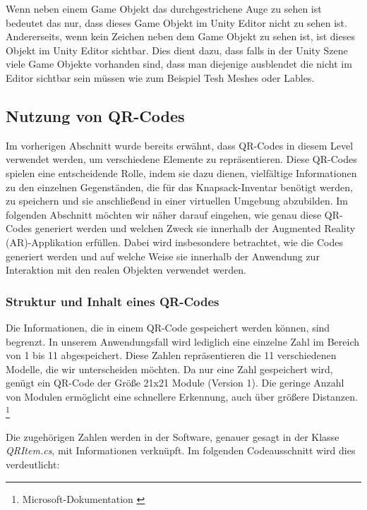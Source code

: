\begin{itemize}
Wenn neben einem Game Objekt das durchgestrichene Auge zu sehen ist bedeutet das nur, dass dieses Game Objekt im Unity Editor nicht zu sehen ist. Andererseits, wenn kein Zeichen
neben dem Game Objekt zu sehen ist, ist dieses Objekt im Unity Editor sichtbar. Dies dient dazu, dass falls in der Unity Szene viele Game Objekte vorhanden sind, dass man
diejenige ausblendet die nicht im Editor sichtbar sein müssen wie zum Beispiel Tesh Meshes oder Lables.


\subsection{\label{sec:qrcodes}Nutzung von QR-Codes} 
Im vorherigen Abschnitt wurde bereits erwähnt, dass QR-Codes in diesem Level verwendet werden, um verschiedene Elemente zu repräsentieren. Diese QR-Codes spielen eine entscheidende Rolle, indem sie dazu dienen, vielfältige Informationen zu den einzelnen Gegenständen, die für das Knapsack-Inventar benötigt werden, zu speichern und sie anschließend in einer virtuellen Umgebung abzubilden. Im folgenden Abschnitt möchten wir näher darauf eingehen, wie genau diese QR-Codes generiert werden und welchen Zweck sie innerhalb der Augmented Reality (AR)-Applikation erfüllen. Dabei wird insbesondere betrachtet, wie die Codes generiert werden und auf welche Weise sie innerhalb der Anwendung zur Interaktion mit den realen Objekten verwendet werden.

\subsubsection{Struktur und Inhalt eines QR-Codes}
Die Informationen, die in einem QR-Code gespeichert werden können, sind begrenzt. In unserem Anwendungsfall wird lediglich
eine einzelne Zahl im Bereich von 1 bis 11 abgespeichert. Diese Zahlen repräsentieren die 11 verschiedenen Modelle, die
wir unterscheiden möchten. Da nur eine Zahl gespeichert wird, genügt ein QR-Code der Größe 21x21 Module (Version 1). Die
geringe Anzahl von Modulen ermöglicht eine schnellere Erkennung, auch über größere
Distanzen.  \footnote{Microsoft-Dokumentation \cite{QR-Code-Tracking}}

Die zugehörigen Zahlen werden in der Software, genauer gesagt in der Klasse \textit{QRItem.cs}, mit Informationen verknüpft. Im folgenden Codeausschnitt wird dies verdeutlicht:


\end{itemize}
